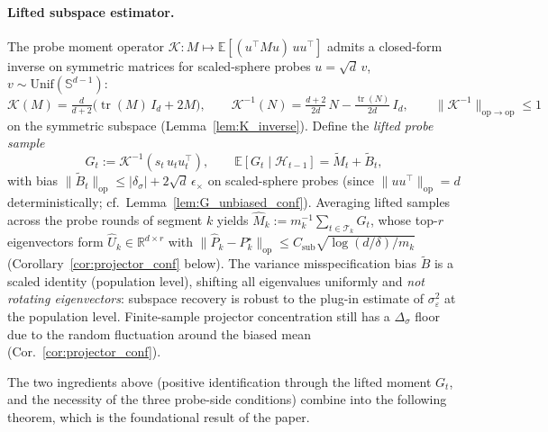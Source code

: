 \documentclass{article}
\newcommand{\R}{\mathbb{R}}
\newcommand{\E}{\mathbb{E}}
\newcommand{\op}{\mathrm{op}}
\newcommand{\cH}{\mathcal{H}}
\newcommand{\cT}{\mathcal{T}}
\DeclareMathOperator{\tr}{tr}
\begin{document}
\paragraph{Lifted subspace estimator.}
The probe moment operator
$\mathcal K : M \mapsto \E[(u^\top M u)\,uu^\top]$ admits a
closed-form inverse on symmetric matrices for scaled-sphere probes
$u=\sqrt d\,v$, $v\sim\mathrm{Unif}(\mathbb S^{d-1})$:
\begin{equation}
\mathcal K(M) = \tfrac{d}{d+2}\bigl(\tr(M)\,I_d + 2M\bigr),\qquad
\mathcal K^{-1}(N) = \tfrac{d+2}{2d}\,N - \tfrac{\tr(N)}{2d}\,I_d,
\qquad \|\mathcal K^{-1}\|_{\op\to\op}\le 1
\label{eq:K_inverse_intro}
\end{equation}
on the symmetric subspace (Lemma~\ref{lem:K_inverse}). Define the
\emph{lifted probe sample}
\begin{equation}
G_t := \mathcal K^{-1}(s_t\,u_tu_t^\top),\qquad
\E[G_t\mid \cH_{t-1}] = \widetilde M_t + \widetilde B_t,
\label{eq:lifted_sample}
\end{equation}
with bias $\|\widetilde B_t\|_\op \le |\delta_\sigma|+
2\sqrt d\,\epsilon_\times$ on scaled-sphere probes (since
$\|uu^\top\|_\op = d$ deterministically; cf.\
Lemma~\ref{lem:G_unbiased_conf}). Averaging lifted samples across
the probe rounds of segment $k$ yields
$\widehat M_k := m_k^{-1}\sum_{t\in\cT_k} G_t$, whose top-$r$
eigenvectors form $\widehat U_k\in\R^{d\times r}$ with
$\|\widehat P_k - P_k^\star\|_\op \le C_{\mathrm{sub}}\sqrt{\log(d/\delta)/m_k}$
(Corollary~\ref{cor:projector_conf} below). The variance
misspecification bias $\widetilde B$ is a scaled identity (population
level), shifting all eigenvalues uniformly and \emph{not rotating
eigenvectors}: subspace recovery is robust to the plug-in estimate
of $\sigma_\varepsilon^2$ at the population level. Finite-sample
projector concentration still has a $\Delta_\sigma$ floor due to the
random fluctuation around the biased mean
(Cor.~\ref{cor:projector_conf}).

The two ingredients above (positive identification through the
lifted moment $G_t$, and the necessity of the three probe-side
conditions) combine into the following theorem, which is the
foundational result of the paper.
\end{document}
